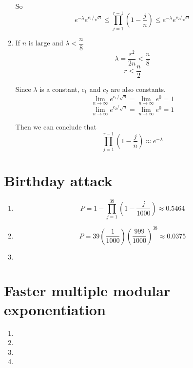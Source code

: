 \documentclass{article}
\begin{document}
\begin{enumerate}
So $$e^{-\lambda}e^{c_1/\sqrt{n}} \leqslant \prod_{j=1}^{r-1} \left(1-\frac{j}{n}\right) \leqslant e^{-\lambda}e^{c_2/\sqrt{n}}$$

\item
If $n$ is large and $\lambda<\dfrac{n}{8}$
$$\lambda=\frac{r^2}{2n}<\frac{n}{8}$$
$$r<\frac{n}{2}$$

Since $\lambda$ is a constant, $c_1$ and $c_2$ are also constants.
$$\lim_{n\to\infty}e^{c_1/\sqrt{n}}=\lim_{n\to\infty}e^0=1$$
$$\lim_{n\to\infty}e^{c_2/\sqrt{n}}=\lim_{n\to\infty}e^0=1$$

Then we can conclude that
$$\prod_{j=1}^{r-1} \left(1-\frac{j}{n}\right) \approx e^{-\lambda}$$
\end{enumerate}

\section{Birthday attack}
\begin{enumerate}
\item
$$P=1-\prod_{j=1}^{39}\left(1-\frac{j}{1000}\right)\approx0.5464$$
\item
$$P=39\left(\frac{1}{1000}\right)\left(\frac{999}{1000}\right)^{38}\approx0.0375$$
\item
\end{enumerate}

\section{Faster multiple modular exponentiation}
\begin{enumerate}
\item
\item
\item
\item
\end{enumerate}
\end{document}
